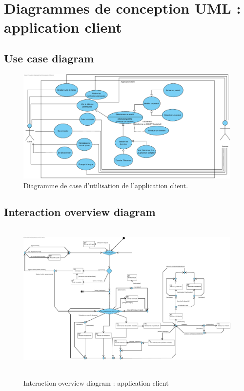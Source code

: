 \documentclass[]{report}
\begin{document}


\newpage




\section{Diagrammes de conception UML : application client}



\subsection{Use case diagram}



\begin{figure}[h]
	\centering\includegraphics[width=\linewidth]{img/Use Case Client.pdf}
	\caption{Diagramme de case d'utilisation de l'application client.}
\end{figure}

\newpage

\subsection{Interaction overview diagram}



\begin{figure}[h!]
\hbox{
	\centering\includegraphics[width=\linewidth]{img/Interaction Overview Client.pdf}
}
\caption{Interaction overview diagram : application client}
\end{figure}
\end{document}
